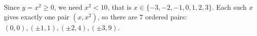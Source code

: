 Since $y=x^2\ge0$, we need $x^2<10$, that is $x\in\{-3,-2,-1,0,1,2,3\}$. Each such $x$ gives exactly one pair $(x,x^2)$, so there are $\boxed{7}$ ordered pairs: $(0,0),(\pm1,1),(\pm2,4),(\pm3,9)$.

